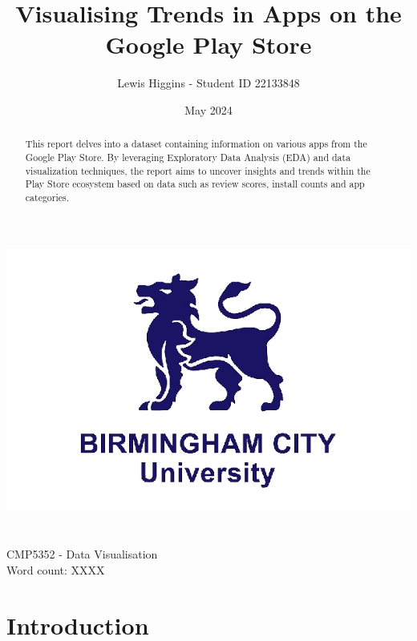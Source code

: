 \documentclass[12pt]{report}\usepackage[]{graphicx}\usepackage[]{xcolor}
\title{Visualising Trends in Apps on the Google Play Store}
\author{Lewis Higgins - Student ID 22133848}
\date{May 2024}
\begin{document}
\makeatletter
\begin{titlepage}
    \begin{center}
        \includegraphics[width=0.7\linewidth]{bcu logo}\\[7ex]
        {\huge \bfseries  \@title }\\[30ex]
        {\@author}\\[2ex]
        {CMP5352 - Data Visualisation}\\[10ex]
        {Word count: XXXX}\\[10ex]
    \end{center}
\end{titlepage}
\makeatother
\thispagestyle{empty}
\newpage

\begin{abstract}

    This report delves into a dataset containing information
    on various apps from the Google Play Store. By leveraging Exploratory Data Analysis (EDA)
    and data visualization techniques, the report aims to uncover insights and trends within 
    the Play Store ecosystem based on data such as review scores, install counts and app
    categories.

\end{abstract} 

\setcounter{page}{0}

\tableofcontents
\thispagestyle{empty}

\chapter*{Introduction}
\end{document}
